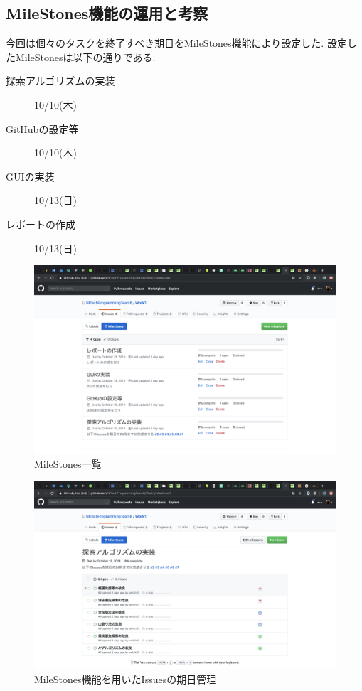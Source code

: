 ﻿\documentclass[uplatex,12pt]{jsarticle}
\begin{document}
\newpage


\subsection{MileStones機能の運用と考察}
今回は個々のタスクを終了すべき期日をMileStones機能により設定した.
設定したMileStonesは以下の通りである. \\
\begin{description}
  \item[探索アルゴリズムの実装] 10/10(木)
  \item[GitHubの設定等] 10/10(木)
  \item[GUIの実装] 10/13(日)
  \item[レポートの作成] 10/13(日)
\end{description}

\begin{figure}[!hbt]
  \centering
  \includegraphics[scale=0.20]{git_image/milestones_list_image.png}
  \caption{MileStones一覧}
\end{figure}

\begin{figure}[!hbt]
  \centering
  \includegraphics[scale=0.20]{git_image/milestones_image.png}
  \caption{MileStones機能を用いたIssuesの期日管理}
\end{figure}
\end{document}
